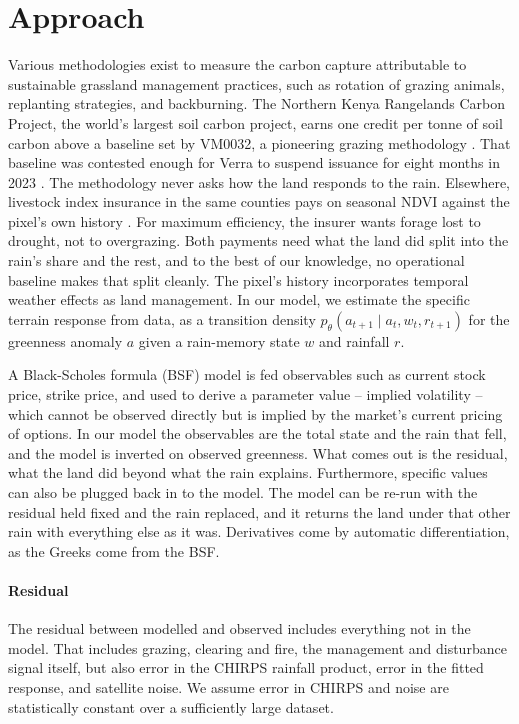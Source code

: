 \documentclass{article}
\begin{document}
\section{Approach}
Various methodologies exist to measure the carbon capture attributable to sustainable grassland management practices, such as rotation of grazing animals, replanting strategies, and backburning. The Northern Kenya Rangelands Carbon Project, the world's largest soil carbon project, earns one credit per tonne of soil carbon above a baseline set by VM0032, a pioneering grazing methodology \citep{verra2023}. That baseline was contested enough for Verra to suspend issuance for eight months in 2023 \citep{verra2023,si2023}. The methodology never asks how the land responds to the rain. Elsewhere, livestock index insurance in the same counties pays on seasonal NDVI against the pixel's own history \citep{ibli}. For maximum efficiency, the insurer wants forage lost to drought, not to overgrazing. Both payments need what the land did split into the rain's share and the rest, and to the best of our knowledge, no operational baseline makes that split cleanly. The pixel's history incorporates temporal weather effects as land management. In our model, we estimate the specific terrain response from data, as a transition density $p_\theta(a_{t+1}\mid a_t, w_t, r_{t+1})$ for the greenness anomaly $a$ given a rain-memory state $w$ and rainfall $r$.

A Black-Scholes formula (BSF) model \cite{bs} is fed observables such as current stock price, strike price, and used to derive a parameter value -- implied volatility -- which cannot be observed directly but is implied by the market's current pricing of options. In our model the observables are the total state and the rain that fell, and the model is inverted on observed greenness. What comes out is the residual, what the land did beyond what the rain explains. Furthermore, specific values can also be plugged back in to the model. The model can be re-run with the residual held fixed and the rain replaced, and it returns the land under that other rain with everything else as it was. Derivatives come by automatic differentiation, as the Greeks come from the BSF.

\paragraph{Residual} The residual between modelled and observed includes everything not in the model. That includes grazing, clearing and fire, the management and disturbance signal itself, but also error in the CHIRPS rainfall product, error in the fitted response, and satellite noise. We assume error in CHIRPS and noise are statistically constant over a sufficiently large dataset.
\end{document}
